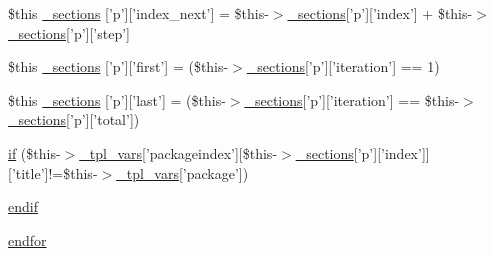 \begin{DoxyCompactItemize}
\item 
\$this \hyperlink{_06_06127_05_06_0612781687_05pkgelementindex_8tpl_8php_a12e484db2ccd39a02dc1d3629356880e}{\-\_\-sections} \mbox{[}'p'\mbox{]}\mbox{[}'index\-\_\-next'\mbox{]} = \$this-\/$>$\hyperlink{_06_06127_05_06_0612781687_05pkgelementindex_8tpl_8php_a9e3d26b39edfe29c3f29b8035ef33828}{\-\_\-sections}\mbox{[}'p'\mbox{]}\mbox{[}'index'\mbox{]} + \$this-\/$>$\hyperlink{_06_06127_05_06_0612781687_05pkgelementindex_8tpl_8php_a9e3d26b39edfe29c3f29b8035ef33828}{\-\_\-sections}\mbox{[}'p'\mbox{]}\mbox{[}'step'\mbox{]}
\item 
\$this \hyperlink{_06_06127_05_06_0612781687_05pkgelementindex_8tpl_8php_a078d9529f4dbce53af052f6d965d9b4a}{\-\_\-sections} \mbox{[}'p'\mbox{]}\mbox{[}'first'\mbox{]} = (\$this-\/$>$\hyperlink{_06_06127_05_06_0612781687_05pkgelementindex_8tpl_8php_a9e3d26b39edfe29c3f29b8035ef33828}{\-\_\-sections}\mbox{[}'p'\mbox{]}\mbox{[}'iteration'\mbox{]} == 1)
\item 
\$this \hyperlink{_06_06127_05_06_0612781687_05pkgelementindex_8tpl_8php_a9e3d26b39edfe29c3f29b8035ef33828}{\-\_\-sections} \mbox{[}'p'\mbox{]}\mbox{[}'last'\mbox{]} = (\$this-\/$>$\hyperlink{_06_06127_05_06_0612781687_05pkgelementindex_8tpl_8php_a9e3d26b39edfe29c3f29b8035ef33828}{\-\_\-sections}\mbox{[}'p'\mbox{]}\mbox{[}'iteration'\mbox{]} == \$this-\/$>$\hyperlink{_06_06127_05_06_0612781687_05pkgelementindex_8tpl_8php_a9e3d26b39edfe29c3f29b8035ef33828}{\-\_\-sections}\mbox{[}'p'\mbox{]}\mbox{[}'total'\mbox{]})
\item 
\hyperlink{_06_06127_05_06_0612781687_05pkgelementindex_8tpl_8php_a2ebe2fd572bce4a203c770b147663cc8}{if} (\$this-\/$>$\hyperlink{_06_06127_05_06_0612781687_05pkgelementindex_8tpl_8php_a4a4846d8e68d455590131a05697f67a3}{\-\_\-tpl\-\_\-vars}\mbox{[}'packageindex'\mbox{]}\mbox{[}\$this-\/$>$\hyperlink{_06_06127_05_06_0612781687_05pkgelementindex_8tpl_8php_a9e3d26b39edfe29c3f29b8035ef33828}{\-\_\-sections}\mbox{[}'p'\mbox{]}\mbox{[}'index'\mbox{]}\mbox{]}\mbox{[}'title'\mbox{]}!=\$this-\/$>$\hyperlink{_06_06127_05_06_0612781687_05pkgelementindex_8tpl_8php_a4a4846d8e68d455590131a05697f67a3}{\-\_\-tpl\-\_\-vars}\mbox{[}'package'\mbox{]})
\item 
\hyperlink{_06_06127_05_06_0612781687_05pkgelementindex_8tpl_8php_a82cd33ca97ff99f2fcc5e9c81d65251b}{endif}
\item 
\hyperlink{_06_06127_05_06_0612781687_05pkgelementindex_8tpl_8php_ae8fdc27183f296411bac00ed522ee1ac}{endfor}
\end{DoxyCompactItemize}


